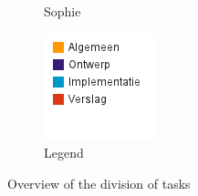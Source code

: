 \documentclass[i2]{oss}
\begin{document}
\begin{figure}[h!]
\begin{subfigure}[hb]{0.20\textwidth}
                \caption{Sophie}
        \end{subfigure}%
                \begin{subfigure}[hb]{0.20\textwidth}
                \centering
                \includegraphics[width=\textwidth]{legende}
                \caption{Legend}
        \end{subfigure}%


 \caption{Overview of the division of tasks}
\label{fig:werkverdeling}
\end{figure}

 
\end{document}
